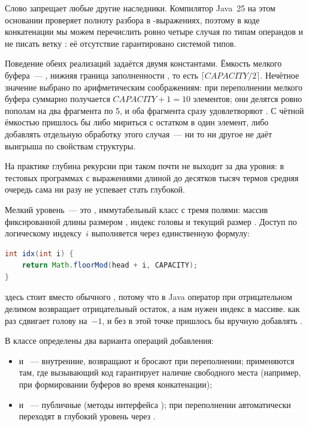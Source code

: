 Слово  запрещает любые другие наследники. Компилятор
Java~25 на этом основании проверяет полноту разбора в
-выражениях, поэтому в коде конкатенации мы можем
перечислить ровно четыре случая по типам операндов и не писать ветку
: её отсутствие гарантировано системой типов.

Поведение обеих реализаций задаётся двумя константами.
Ёмкость мелкого буфера~--- ,
нижняя граница заполненности , то есть
$\lceil CAPACITY / 2 \rceil$. Нечётное значение выбрано по
арифметическим соображениям: при переполнении мелкого буфера суммарно
получается $CAPACITY + 1 = 10$ элементов; они делятся ровно пополам
на два фрагмента по 5, и оба фрагмента сразу удовлетворяют
. С чётной ёмкостью пришлось бы либо мириться с
остатком в один элемент, либо добавлять отдельную обработку этого
случая~--- ни то ни другое не даёт выигрыша по свойствам структуры.

На практике глубина рекурсии  при таком 
почти не выходит за два уровня: в тестовых программах с выражениями
длиной до десятков тысяч термов средняя очередь сама ни разу не успевает
стать глубокой.

Мелкий уровень~--- это , иммутабельный класс с тремя полями:
массив фиксированной длины  размером ,
индекс головы  и текущий размер .
Доступ по логическому индексу~$i$ выполняется через единственную формулу:

\begin{lstlisting}[language=Java,caption={Циклическое индексирование в ShallowDeque},label={lst:shallow-idx}]
int idx(int i) {
    return Math.floorMod(head + i, CAPACITY);
}
\end{lstlisting}

 здесь стоит вместо обычного \prog{\%}, потому что в Java
оператор \prog{\%} при отрицательном делимом возвращает отрицательный
остаток, а нам нужен индекс в массиве.  как раз
сдвигает голову на~$-1$, и без  в этой точке пришлось бы
вручную добавлять .

В классе определены два варианта операций добавления:
\begin{itemize}
  \item {} и ~--- внутренние, возвращают
         и бросают  при переполнении;
        применяются там, где вызывающий код гарантирует наличие свободного места
        (например, при формировании буферов во время конкатенации);
  \item {} и ~--- публичные (методы
        интерфейса ); при переполнении автоматически переходят
        в глубокий уровень через .
\end{itemize}

